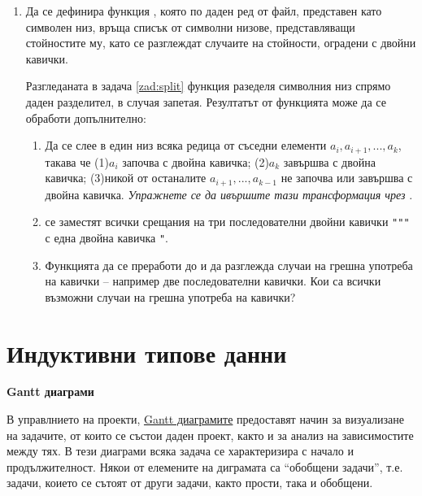 \begin{enumerate}[]
\begin{mdframed}[hidealllines=true,backgroundcolor=gray!20]
\end{mdframed}

\item Да се дефинира функция , която по даден ред от  файл, представен като символен низ, връща списък от символни низове, представляващи стойностите му, като се разглеждат случаите на стойности, оградени с двойни кавички.

Разгледаната в задача \ref{zad:split} функция  разеделя символния низ спрямо даден разделител, в случая запетая. Резултатът от функцията може да се обработи допълнително:
\begin{enumerate}[label=\alph*)]
	\item Да се слее в един низ всяка редица от съседни елементи $a_i,a_{i+1},...,a_k$, такава че (1)$a_i$ започва с двойна кавичка;  (2)$a_k$ завършва с двойна кавичка; (3)никой от останалите $a_{i+1},...,a_{k-1}$ не започва или завършва с двойна кавичка. \emph{Упражнете се да ивършите тази трансформация чрез }.
	\item се заместят всички срещания на три последователни двойни кавички \verb#"""# с една двойна кавичка \verb#"#.
	\item Функцията да се преработи до  и да разглежда случаи на грешна употреба на кавички -- например две последователни кавички. Кои са всички възможни случаи на грешна употреба на кавички?
\end{enumerate}

\end{enumerate}


\section {Индуктивни типове данни}


\begin{mdframed}[hidealllines=true,backgroundcolor=gray!20]
\textbf{Gantt диаграми}

В управлнието на проекти, \href{https://en.wikipedia.org/wiki/Gantt_chart}{Gantt диаграмите} предоставят начин за визуализане на задачите, от които се състои даден проект, както и за анализ на зависимостите между тях. В тези диаграми всяка задача се характеризира с начало и продължителност. Някои от елемените на диграмата са ``обобщени задачи'', т.е. задачи, коието се сътоят от други задачи, както прости, така и обобщени.
\end{mdframed}

